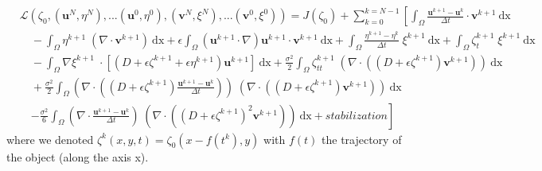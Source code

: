 \documentclass[11pt,a4paper]{article}
\begin{document}
		\begin{equation}
			\begin{split}
				&\mathcal{L}(\zeta_0, (\mathbf{u}^N, \eta^N), ... (\mathbf{u}^0, \eta^0), 	(\mathbf{v}^N, \xi^N), ... (\mathbf{v}^0, \xi^0))	= J(\zeta_0) + \sum_{k=0}^{k=N-1} \left[ \int_{\Omega} \! \frac{\mathbf{u}^{k+1} - \mathbf{u}^k}{\Delta t} \cdot	\mathbf{v}^{k+1} \: \mathrm{dx} \right. \\
				 &\quad - \int_{\Omega} \! \eta^{k+1} \; (\nabla \cdot \mathbf{v}^{k+1}) \: \mathrm{dx} + \epsilon \! \int_{\Omega} \! (\mathbf{u}^{k+1} \cdot \nabla ) \mathbf{u}^{k+1} \cdot	\mathbf{v}^{k+1} \: \mathrm{dx} + \displaystyle\int_{\Omega}\! \frac{\eta^{k+1} - \eta^{k}}{\Delta t} \; \xi^{k+1} \: \mathrm{dx} + \int_{\Omega}\! \zeta^{k+1}_t \; \xi^{k+1} \: \mathrm{dx} \\
				 &\quad-\int_{\Omega}\! \nabla \xi^{k+1} \; \cdot [(D + \epsilon \zeta^{k+1} + \epsilon \eta^{k+1}) \mathbf{u}^{k+1}] \:	\mathrm{dx} + \frac{\sigma^2}{2} \! \int_{\Omega} \! \zeta^{k+1}_{tt}  \; (\nabla \cdot( (D+\epsilon \zeta^{k+1}) \mathbf{v}^{k+1})) \: \mathrm{dx} \\ 
					&\quad+ \frac{\sigma^2}{2} \! \int_{\Omega} \!  (\nabla \cdot ((D + \epsilon \zeta^{k+1})	\frac{\mathbf{u}^{k+1} - \mathbf{u}^{k}}{\Delta t})) \; (\nabla \cdot ((D + \epsilon \zeta^{k+1}) \mathbf{v}^{k+1})) \: \mathrm{dx} \\
					&\quad\left. - \frac{\sigma^2}{6} \! \int_{\Omega} \! (\nabla 
					\cdot \frac{\mathbf{u}^{k+1} - \mathbf{u}^{k}}{\Delta t}) \; (\nabla  \cdot	((D + \epsilon \zeta^{k+1})^2  \mathbf{v}^{k+1})) \: \mathrm{dx} + stabilization\right]	
			\end{split}
		\end{equation}
		where we denoted $\zeta^k(x,y,t) = \zeta_0(x-f(t^k),y)$ with $f(t)$ the trajectory of the object (along the axis x).
		
\end{document}
